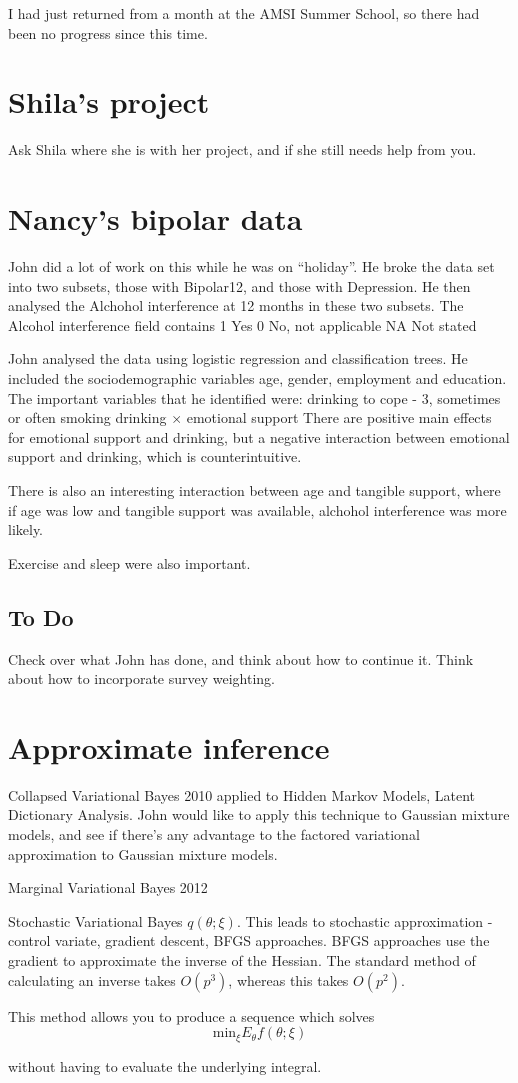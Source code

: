 \documentclass{amsart}
\begin{document}
I had just returned from a month at the AMSI Summer School, so there had been no progress since this time.

\section{Shila's project}
Ask Shila where she is with her project, and if she still needs help from you.

\section{Nancy's bipolar data}
John did a lot of work on this while he was on ``holiday''. He broke the data set into two subsets,
those with Bipolar12, and those with Depression. He then analysed the Alchohol interference
at 12 months in these two subsets. The Alcohol interference field contains
1 Yes
0 No, not applicable
NA Not stated

John analysed the data using logistic regression and classification trees.
He included the sociodemographic variables age, gender, employment and education.
The important variables that he identified were:
drinking to cope - 3, sometimes or often
smoking
drinking $\times$ emotional support
There are positive main effects for emotional support and drinking, but a negative
interaction between emotional support and drinking, which is counterintuitive.

There is also an interesting interaction between age and tangible support,
where if age was low and tangible support was available, alchohol interference
was more likely.

Exercise and sleep were also important.

\subsection{To Do}
Check over what John has done, and think about how to continue it. Think about how to incorporate survey weighting.

\section{Approximate inference}
Collapsed Variational Bayes 2010 applied to Hidden Markov Models, Latent Dictionary Analysis. John would like to apply this
technique to Gaussian mixture models, and see if there's any advantage to the factored variational approximation to
Gaussian mixture models.

Marginal Variational Bayes 2012

Stochastic Variational Bayes $q(\theta; \xi)$. This leads to stochastic approximation - control variate,
gradient descent, BFGS approaches. BFGS approaches use the gradient to approximate the inverse of the
Hessian. The standard method of calculating an inverse takes $O(p^3)$, whereas this takes $O(p^2)$.

This method allows you to produce a sequence which solves
$$
\text{min}_{\xi} E_{\theta} f(\theta; \xi)
$$

without having to evaluate the underlying integral.
\end{document}
